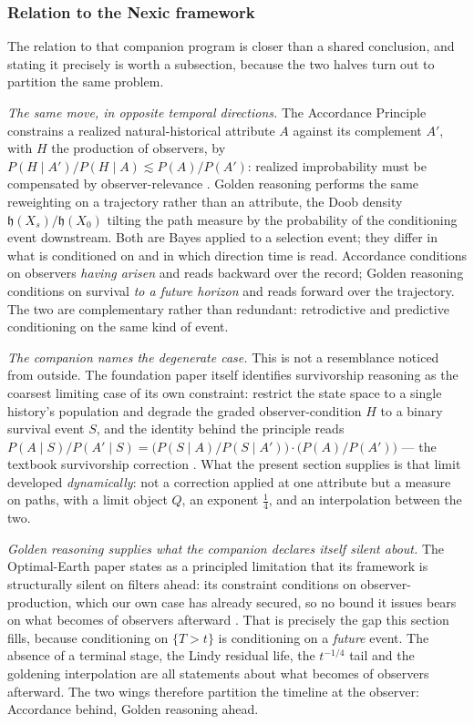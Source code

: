 \documentclass[11pt]{article}
\numberwithin{equation}{section}
\theoremstyle{plain}
\theoremstyle{definition}
\theoremstyle{remark}
\newcommand{\hm}{\mathfrak{h}}
\begin{document}
\subsubsection{Relation to the Nexic framework}
\label{gr:subsub:nexic}

The relation to that companion program is closer than a shared
conclusion, and stating it precisely is worth a subsection, because the
two halves turn out to partition the same problem.

\emph{The same move, in opposite temporal directions.} The Accordance
Principle constrains a realized natural-historical attribute $A$ against
its complement $A'$, with $H$ the production of observers, by
$P(H\mid A')/P(H\mid A)\lesssim P(A)/P(A')$: realized improbability must
be compensated by observer-relevance \cite{Ben26Found}. Golden reasoning
performs the same reweighting on a trajectory rather than an attribute,
the Doob density $\hm(X_s)/\hm(X_0)$ tilting the path measure by the
probability of the conditioning event downstream. Both are Bayes applied
to a selection event; they differ in what is conditioned on and in which
direction time is read. Accordance conditions on observers \emph{having
arisen} and reads backward over the record; Golden reasoning conditions
on survival \emph{to a future horizon} and reads forward over the
trajectory. The two are complementary rather than redundant:
retrodictive and predictive conditioning on the same kind of event.

\emph{The companion names the degenerate case.} This is not a
resemblance noticed from outside. The foundation paper itself identifies
survivorship reasoning as the coarsest limiting case of its own
constraint: restrict the state space to a single history's population
and degrade the graded observer-condition $H$ to a binary survival event
$S$, and the identity behind the principle reads
$P(A\mid S)/P(A'\mid S) = \bigl(P(S\mid A)/P(S\mid A')\bigr)\cdot
\bigl(P(A)/P(A')\bigr)$ --- the textbook survivorship correction
\cite{Ben26Found}. What the present section supplies is that limit
developed \emph{dynamically}: not a correction applied at one attribute
but a measure on paths, with a limit object $Q$, an exponent
$\tfrac14$, and an interpolation between the two.

\emph{Golden reasoning supplies what the companion declares itself
silent about.} The Optimal-Earth paper states as a principled limitation
that its framework is structurally silent on filters ahead: its
constraint conditions on observer-production, which our own case has
already secured, so no bound it issues bears on what becomes of
observers afterward \cite{Ben26Optimal}. That is precisely the gap this
section fills, because conditioning on $\{T>t\}$ is conditioning on a
\emph{future} event. The absence of a terminal stage, the Lindy residual
life, the $t^{-1/4}$ tail and the goldening interpolation are all
statements about what becomes of observers afterward. The two wings
therefore partition the timeline at the observer: Accordance behind,
Golden reasoning ahead.
\end{document}
